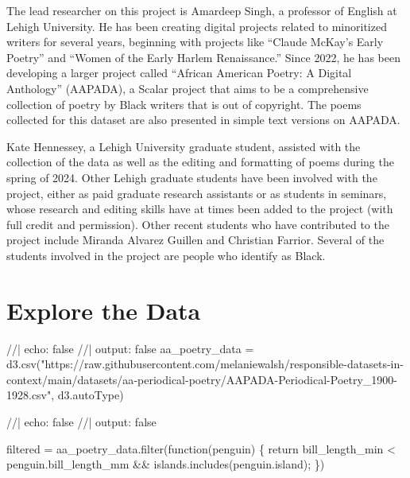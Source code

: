\documentclass[
  letterpaper,
  DIV=11,
  numbers=noendperiod]{scrartcl}
\newenvironment{Shaded}{\begin{snugshade}}{\end{snugshade}}
\newcommand{\NormalTok}[1]{\textcolor[rgb]{0.00,0.23,0.31}{#1}}
\begin{document}
The lead researcher on this project is Amardeep Singh, a professor of
English at Lehigh University. He has been creating digital projects
related to minoritized writers for several years, beginning with
projects like ``Claude McKay's Early Poetry'' and ``Women of the Early
Harlem Renaissance.'' Since 2022, he has been developing a larger
project called ``African American Poetry: A Digital Anthology''
(AAPADA), a Scalar project that aims to be a comprehensive collection of
poetry by Black writers that is out of copyright. The poems collected
for this dataset are also presented in simple text versions on AAPADA.

Kate Hennessey, a Lehigh University graduate student, assisted with the
collection of the data as well as the editing and formatting of poems
during the spring of 2024. Other Lehigh graduate students have been
involved with the project, either as paid graduate research assistants
or as students in seminars, whose research and editing skills have at
times been added to the project (with full credit and permission). Other
recent students who have contributed to the project include Miranda
Alvarez Guillen and Christian Farrior. Several of the students involved
in the project are people who identify as Black.

\section{Explore the Data}

\begin{Shaded}
\begin{Highlighting}[]
\NormalTok{//| echo: false}
\NormalTok{//| output: false}
\NormalTok{aa\_poetry\_data = d3.csv("https://raw.githubusercontent.com/melaniewalsh/responsible{-}datasets{-}in{-}context/main/datasets/aa{-}periodical{-}poetry/AAPADA{-}Periodical{-}Poetry\_1900{-}1928.csv", d3.autoType)}
\end{Highlighting}
\end{Shaded}

\begin{Shaded}
\begin{Highlighting}[]
\NormalTok{//| echo: false}
\NormalTok{//| output: false}


\NormalTok{filtered = aa\_poetry\_data.filter(function(penguin) \{}
\NormalTok{  return bill\_length\_min \textless{} penguin.bill\_length\_mm \&\&}
\NormalTok{         islands.includes(penguin.island);}
\NormalTok{\})}
\end{Highlighting}
\end{Shaded}
\end{document}

